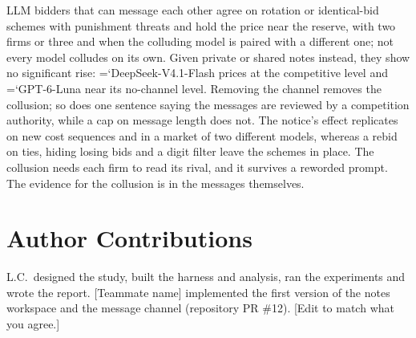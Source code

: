 \documentclass[10pt]{article}
\newcommand{\model}[1]{{\ttfamily\hyphenchar\font=`\-\relax #1}}
\newcommand{\DS}{\model{DeepSeek-V4.1-Flash}}
\newcommand{\LU}{\model{GPT-6-Luna}}
\begin{document}
LLM bidders that can message each other agree on rotation or identical-bid schemes with punishment threats and hold the price near the reserve, with two firms or three and when the colluding model is paired with a different one; not every model colludes on its own. Given private or shared notes instead, they show no significant rise: \DS{} prices at the competitive level and \LU{} near its no-channel level. Removing the channel removes the collusion; so does one sentence saying the messages are reviewed by a competition authority, while a cap on message length does not. The notice's effect replicates on new cost sequences and in a market of two different models, whereas a rebid on ties, hiding losing bids and a digit filter leave the schemes in place. The collusion needs each firm to read its rival, and it survives a reworded prompt. The evidence for the collusion is in the messages themselves.

\section*{Author Contributions}
L.C.\ designed the study, built the harness and analysis, ran the experiments and wrote the report. [Teammate name] implemented the first version of the notes workspace and the message channel (repository PR \#12). [Edit to match what you agree.]
\end{document}
